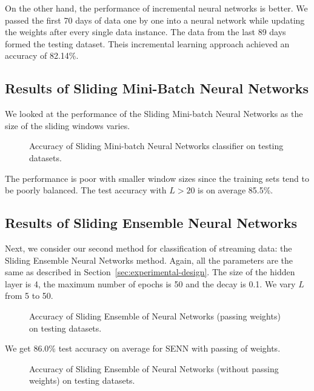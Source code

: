 \documentclass[conference]{IEEEtran}
\begin{document}
		On the other hand, the performance of incremental neural networks is better. We passed the first 70 days of data one by one into a neural network while updating the weights after every single data instance. The data from the last 89 days formed the testing dataset. Theis incremental learning approach achieved an accuracy of 82.14\%.
		
		\subsection{Results of Sliding Mini-Batch Neural Networks}
		
		We looked at the performance of the Sliding Mini-batch Neural Networks as the size of the sliding windows varies.
		\begin{figure}[H]
			\centering
			\caption{Accuracy of Sliding Mini-batch Neural Networks classifier on testing datasets.}
			\label{fig:accuracy-smnn}
		\end{figure}
		The performance is poor with smaller window sizes since the training sets tend to be poorly balanced. The test accuracy with $L > 20$ is on average 85.5\%.
		
		
		\subsection{Results of Sliding Ensemble Neural Networks}
		\label{sec:senn-results}
		
		Next, we consider our second method for classification of streaming data: the Sliding Ensemble Neural Networks method.
		Again, all the parameters are the same as described in Section~\ref{sec:experimental-design}. The size of the hidden layer is 4, the maximum number of epochs is 50 and the decay is 0.1. We vary $L$ from 5 to 50.
		
		\begin{figure}[H]
			\centering
			\caption{Accuracy of Sliding Ensemble of Neural Networks (passing weights) on  testing datasets.}
			\label{fig:results-nnet-ensemble}
		\end{figure}
		
		We get 86.0\% test accuracy on average for SENN with passing of weights.
		
		\begin{figure}[H]
			\centering
			\caption{Accuracy of Sliding Ensemble of Neural Networks (without passing weights) on  testing datasets.}
			\label{fig:results-nnet-ensemble}
		\end{figure}
		
\end{document}
